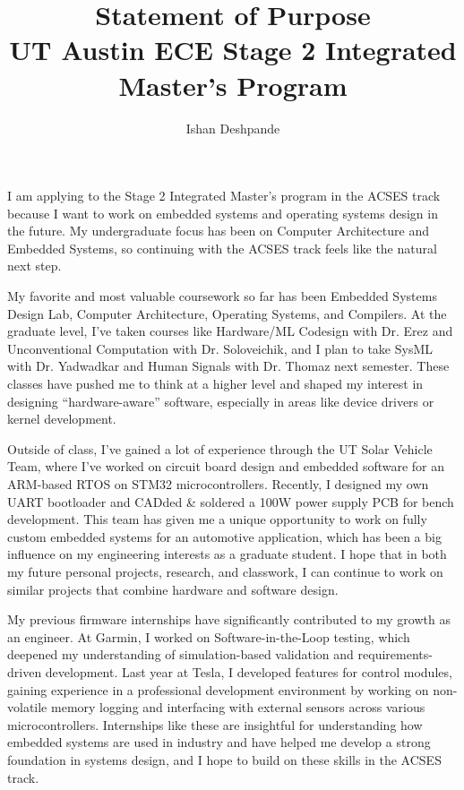 \documentclass[12pt]{article}
\title{Statement of Purpose\\ \large UT Austin ECE Stage 2 Integrated Master’s Program}
\author{\small Ishan Deshpande}
\date{}
\begin{document}
\maketitle

I am applying to the Stage 2 Integrated Master’s program in the ACSES track because I want to work on embedded systems and operating systems design in the future. My undergraduate focus has been on Computer Architecture and Embedded Systems, so continuing with the ACSES track feels like the natural next step.

My favorite and most valuable coursework so far has been Embedded Systems Design Lab, Computer Architecture, Operating Systems, and Compilers. At the graduate level, I’ve taken courses like Hardware/ML Codesign with Dr. Erez and Unconventional Computation with Dr. Soloveichik, and I plan to take SysML with Dr. Yadwadkar and Human Signals with Dr. Thomaz next semester. These classes have pushed me to think at a higher level and shaped my interest in designing “hardware-aware” software, especially in areas like device drivers or kernel development.

Outside of class, I’ve gained a lot of experience through the UT Solar Vehicle Team, where I’ve worked on circuit board design and embedded software for an ARM-based RTOS on STM32 microcontrollers. Recently, I designed my own UART bootloader and CADded \& soldered a 100W power supply PCB for bench development. This team has given me a unique opportunity to work on fully custom embedded systems for an automotive application, which has been a big influence on my engineering interests as a graduate student. I hope that in both my future personal projects, research, and classwork, I can continue to work on similar projects that combine hardware and software design.

My previous firmware internships have significantly contributed to my growth as an engineer. At Garmin, I worked on Software-in-the-Loop testing, which deepened my understanding of simulation-based validation and requirements-driven development. Last year at Tesla, I developed features for control modules, gaining experience in a professional development environment by working on non-volatile memory logging and interfacing with external sensors across various microcontrollers. Internships like these are insightful for understanding how embedded systems are used in industry and have helped me develop a strong foundation in systems design, and I hope to build on these skills in the ACSES track.
\end{document}
